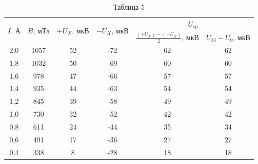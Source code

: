 \documentclass[a4paper,12pt]{article} %
\begin{document}
\begin{table}[h!]
	\centering
	\begin{tabular}{|c|c|c|c|c|c|}
		\hline
		\multirow{2}{*}{$I$, А} & \multirow{2}{*}{$B$, мТл} & \multirow{2}{*}{$+U_X$, мкВ} & \multirow{2}{*}{$-U_X$, мкВ} & \multicolumn{2}{c|}{$U_{\text{ср}}$}                   \\ \cline{5-6} 
		&                           &                              &                              & $\frac{(+U_X) - (-U_X)}{2}$, мкВ & $U_{34} - U_0$, мкВ \\ \hline
		2,0                     & 1057                      & 52                           & -72                          & 62                               & 62                  \\ \hline
		1,8                     & 1032                      & 50                           & -69                          & 60                               & 60                  \\ \hline
		1,6                     & 978                       & 47                           & -66                          & 57                               & 57                  \\ \hline
		1,4                     & 935                       & 44                           & -63                          & 54                               & 54                  \\ \hline
		1,2                     & 845                       & 39                           & -58                          & 49                               & 49                  \\ \hline
		1,0                     & 730                       & 32                           & -52                          & 42                               & 42                  \\ \hline
		0,8                     & 611                       & 24                           & -44                          & 35                               & 34                  \\ \hline
		0,6                     & 491                       & 17                           & -36                          & 27                               & 27                  \\ \hline
		0,4                     & 338                       & 8                            & -28                          & 18                               & 18                  \\ \hline
	\end{tabular}
	\caption*{Таблица 5}
\end{table}
\end{document}
